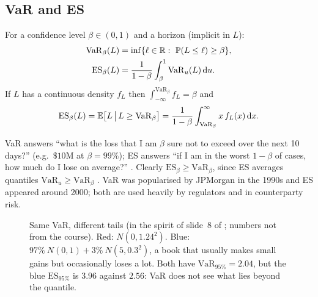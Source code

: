 \begin{paracol}{2}
\subsection{VaR and ES}
\begin{definition}\label{ch08:def-vares}
For a confidence level $\beta\in(0,1)$ and a horizon (implicit in $L$):
\begin{align*}
  \mathrm{VaR}_\beta(L) &= \inf\{\ell\in\R:\ \Prob(L\le\ell)\ge\beta\}, \\
  \mathrm{ES}_\beta(L)  &= \frac{1}{1-\beta}\int_\beta^1\mathrm{VaR}_u(L)\dd u .
\end{align*}
If $L$ has a continuous density $f_L$ then $\int_{-\infty}^{\mathrm{VaR}_\beta}f_L=\beta$ and
\[
  \mathrm{ES}_\beta(L)=\mathbb{E}\bigl[L\,\big|\,L\ge\mathrm{VaR}_\beta\bigr]
  =\frac{1}{1-\beta}\int_{\mathrm{VaR}_\beta}^\infty x\,f_L(x)\,\mathrm{d} x .
\]
\end{definition}
VaR answers ``what is the loss that I am $\beta$ sure not to exceed over the next 10 days?'' (e.g.\ $\$10$M at
$\beta=99\%$); ES answers ``if I am in the worst $1-\beta$ of cases, how much do I lose on average?''
. Clearly $\mathrm{ES}_\beta\ge\mathrm{VaR}_\beta$, since ES averages quantiles $\mathrm{VaR}_u\ge
\mathrm{VaR}_\beta$ . VaR was popularised by JPMorgan in the 1990s and ES appeared around 2000;
both are used heavily by regulators and in counterparty risk.

\begin{figure}[ht]
\centering
{}
\caption{Same VaR, different tails (in the spirit of slide~8 of ; numbers not from the course). Red:
$N(0,1.24^2)$. Blue: $97\%\ N(0,1)+3\%\ N(5,0.3^2)$, a book that usually makes small gains but occasionally
loses a lot. Both have $\mathrm{VaR}_{95\%}=2.04$, but the blue $\mathrm{ES}_{95\%}$ is $3.96$ against $2.56$:
VaR does not see what lies beyond the quantile.}\label{ch08:fig-fattail}
\end{figure}


\end{paracol}
